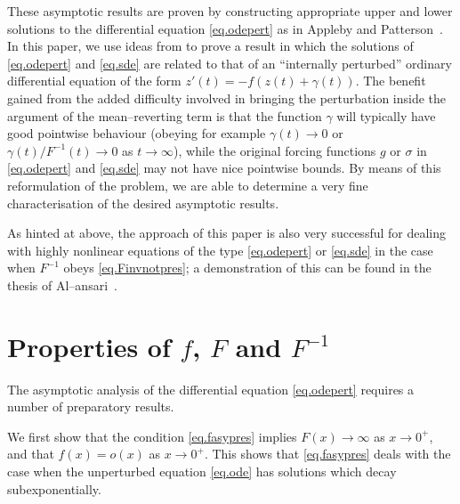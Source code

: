 \documentclass[a4paper,10pt,reqno]{amsart}
\numberwithin{equation}{section}
\theoremstyle{definition}
\theoremstyle{remark}
\DeclareMathOperator{\1}{\mathbbm 1}
\begin{document}
	These asymptotic results are proven by constructing appropriate upper and lower solutions to the differential equation \eqref{eq.odepert} as in Appleby and Patterson~\cite{apppatt, apppatt2}. In this paper, we use ideas from \cite{apppatt2} to  prove a result in which the solutions of \eqref{eq.odepert} and \eqref{eq.sde} are related to that of an 
	``internally perturbed'' ordinary differential equation of the form $z'(t)=-f(z(t)+\gamma(t))$. The benefit gained from the added difficulty involved in bringing the perturbation inside the argument of the mean--reverting term is that the function $\gamma$ will typically have good pointwise behaviour (obeying for example 
	$\gamma(t)\to 0$ or $\gamma(t)/F^{-1}(t)\to 0$ as $t\to\infty$), while the original forcing functions $g$ or $\sigma$ in \eqref{eq.odepert} and \eqref{eq.sde} 
	may not have nice pointwise bounds. By means of this reformulation of the problem, we are able to determine a very fine characterisation of the desired asymptotic results. 
	
	As hinted at above, the approach of this paper is also very successful for dealing with highly nonlinear equations of the type \eqref{eq.odepert} or \eqref{eq.sde}
	in the case when $F^{-1}$ obeys \eqref{eq.Finvnotpres}; a demonstration of this can be found in the thesis of Al--ansari~\cite{tahanithesis}.
	
	\section{Properties of $f$, $F$ and $F^{-1}$} 
	
	The asymptotic analysis of the differential equation \eqref{eq.odepert} requires a number of preparatory results. 
	
	We first show that the condition \eqref{eq.fasypres} implies $F(x)\to\infty$ as $x\to 0^+$, and that $f(x)=o(x)$ as $x\to 0^+$. This shows that \eqref{eq.fasypres} deals with the case when the unperturbed equation \eqref{eq.ode} has solutions which decay subexponentially.    
	
\end{document}
